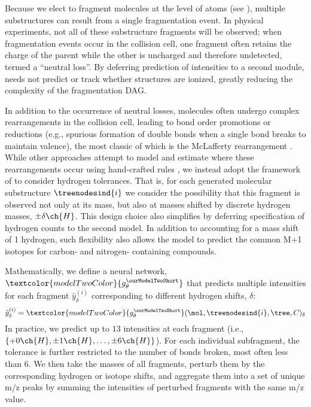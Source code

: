 \documentclass[journal=jcim,manuscript=article]{achemso}
\begin{document}
Because we elect to fragment molecules at the level of atoms (see ), multiple substructures can result from a single fragmentation event. In physical experiments, not all of these substructure fragments will be observed; when fragmentation events occur in the collision cell, one fragment often retains the charge of the parent while the other is uncharged and therefore undetected, termed a ``neutral loss''. By deferring prediction of intensities to a second module, \ourModelOneShort needs not predict or track whether structures are ionized, greatly reducing the complexity of the fragmentation DAG.

In addition to the occurrence of neutral losses, molecules often undergo complex rearrangements in the collision cell, leading to bond order promotions or reductions (e.g., spurious formation of double bonds when a single bond breaks to maintain valence), the most classic of which is the McLafferty rearrangement \cite{demarque2016fragmentation, mclafferty1959mass}. While other approaches attempt to model and estimate where these rearrangements occur using hand-crafted rules \cite{allen_competitive_2015}, we instead adopt the framework of \citeauthor{ridder_automatic_2014} \cite{ridder_automatic_2014} to consider hydrogen tolerances. That is, for each generated molecular substructure $\treenodesind{i}$ we consider the possibility that this fragment is observed not only at its mass, but also at masses shifted by discrete hydrogen masses, $\pm \delta \ch{H}$. This design choice also  simplifies \ourModelOneShort by deferring specification of hydrogen counts to the second model.  In addition to accounting for a mass shift of 1 hydrogen, such flexibility also allows the model to predict the common M+1 isotopes for carbon- and nitrogen- containing compounds.

Mathematically, we define a neural network, $\textcolor{modelTwoColor}{g_{\theta}^{\ourModelTwoShort}}$  that predicts multiple intensities for each fragment $\hat{y}_{\delta}^{(i)}$ corresponding to different hydrogen shifts, $\delta$:
\begin{equation}
  \hat{y}_{\delta}^{(i)} = \textcolor{modelTwoColor}{g_{\theta}^{\ourModelTwoShort}}(\mol,\treenodesind{i}, \tree, C)_\delta
\end{equation}
In practice, we predict up to $13$ intensities at each fragment (i.e., $\{+0\ch{H}, \pm1\ch{H}, \dots, \pm6\ch{H}\}$). For each individual subfragment, the tolerance is further restricted to the number of bonds broken, most often less than $6$. We then take the masses of all fragments, perturb them by the corresponding hydrogen or isotope shifts, and aggregate them into a set of unique m/z peaks by summing the intensities of perturbed fragments with the same m/z value.
\end{document}
